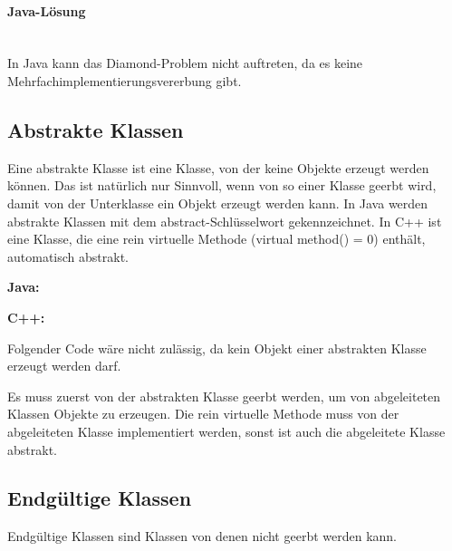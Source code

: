 			\paragraph{Java-Lösung}\mbox{}\\
				In Java kann das Diamond-Problem nicht auftreten, da es keine Mehrfachimplementierungsvererbung gibt.
			
	\subsection{Abstrakte Klassen}
		Eine abstrakte Klasse ist eine Klasse, von der keine Objekte erzeugt werden können. Das ist natürlich nur Sinnvoll,
		wenn von so einer Klasse geerbt wird, damit von der Unterklasse ein Objekt erzeugt werden kann. In Java werden
		abstrakte Klassen mit dem abstract-Schlüsselwort gekennzeichnet. In C++ ist eine Klasse, die eine rein virtuelle
		Methode (virtual method() = 0) enthält, automatisch abstrakt.
		
		{\bfseries Java:}
			\UseRawInputEncoding{}
		
		{\bfseries C++:}
			\UseRawInputEncoding{}
			
			Folgender Code wäre nicht zulässig, da kein Objekt einer abstrakten Klasse erzeugt werden darf.
			\UseRawInputEncoding{}
			
			Es muss zuerst von der abstrakten Klasse geerbt werden, um von abgeleiteten Klassen Objekte zu erzeugen. Die rein
			virtuelle Methode muss von der abgeleiteten Klasse implementiert werden, sonst ist auch die abgeleitete Klasse
			abstrakt.
			\UseRawInputEncoding{}
	
	\subsection{Endgültige Klassen}
		Endgültige Klassen sind Klassen von denen nicht geerbt werden kann.
		\UseRawInputEncoding{}

